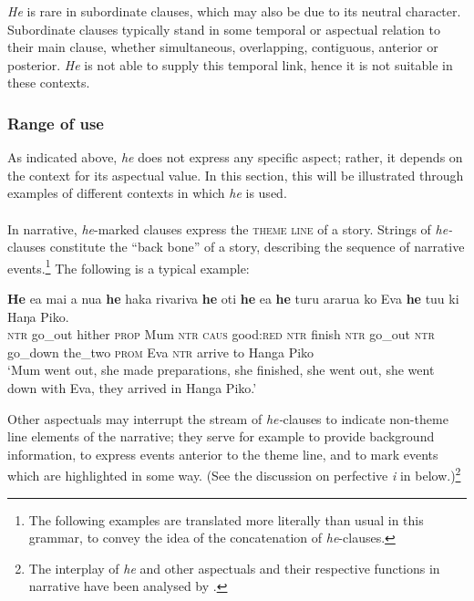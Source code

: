 \textit{He} is rare in subordinate clauses, which may also be due to its neutral character. Subordinate clauses typically stand in some temporal or aspectual relation to their main clause, whether simultaneous, overlapping, contiguous, anterior or posterior. \textit{He} is not able to supply this temporal link, hence it is not suitable in these contexts.

\subsubsection[Range of use]{Range of use}\label{sec:7.2.3.2}
\largerpage
As indicated above, \textit{he} does not express any specific aspect; rather, it depends on the context for its aspectual value. In this section, this will be illustrated through examples of different contexts in which \textit{he} is used.

\paragraph{}\label{sec:7.2.3.2.1} In narrative, \textit{he}{}-marked clauses express the \textsc{theme line} of a story. Strings of \textit{he-}clauses constitute the “back bone” of a story, describing the sequence of narrative events.\footnote{\label{fn:314}The following examples are translated more literally than usual in this grammar, to convey the idea of the concatenation of \textit{he}{}-clauses.} The following is a typical example:

\ea\label{ex:7.3}
\gll \textbf{He} e{\ꞌ}a mai a nua \textbf{he} haka rivariva \textbf{he} oti \textbf{he} e{\ꞌ}a  \textbf{he} turu ararua ko Eva \textbf{he} tu{\ꞌ}u ki Haŋa Piko.\\
\textsc{ntr} go\_out hither \textsc{prop} Mum \textsc{ntr} \textsc{caus} good:\textsc{red} \textsc{ntr} finish \textsc{ntr} go\_out  \textsc{ntr} go\_down the\_two \textsc{prom} Eva \textsc{ntr} arrive to Hanga Piko\\

\glt
‘Mum went out, she made preparations, she finished, she went out, she went down with Eva, they arrived in Hanga Piko.’ \textstyleExampleref{[R210.038]} 
\z

Other aspectuals may interrupt the stream of \textit{he-}clauses to indicate non-theme line elements of the narrative; they serve for example to provide background information, to express events anterior to the theme line, and to mark events which are highlighted in some way. (See the discussion on perfective \textit{i} in  below.)\footnote{\label{fn:315}The interplay of \textit{he} and other aspectuals and their respective functions in narrative have been analysed by \citet{WeberR2003}.} 


